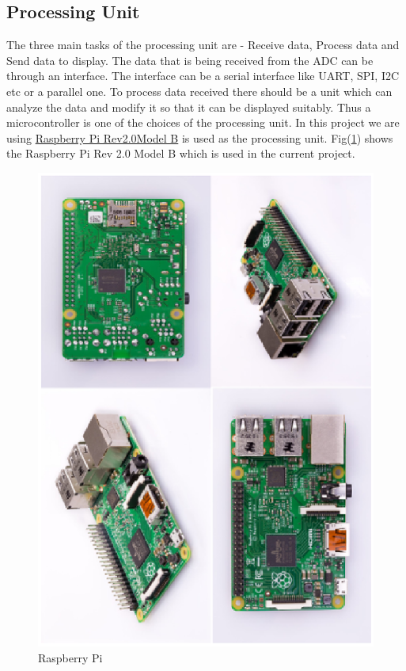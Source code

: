\documentclass[12pt, a4paper, twoside]{article}
\begin{document}
\subsection{Processing Unit}
    The three main tasks of the processing unit are - Receive data, Process data and Send data to display. The data that is being received from the ADC can be through an interface. The interface can be a serial interface like UART, SPI, I2C etc or a parallel one. To process data received there should be a unit which can analyze the data and modify it so that it can be displayed suitably. Thus a microcontroller is one of the choices of the processing unit. In this project we are using \href{https://www.raspberrypi.org/}{Raspberry Pi Rev2.0Model B}\cite{bib_raspberrypi}  is used as the processing unit. Fig(\ref{fig_rpi}) shows the Raspberry Pi Rev 2.0 Model B which is used in the current project.
 
\begin{figure}[ht]
    \centering
    \includegraphics[scale=0.75]{rpi.ps}
    \caption{Raspberry Pi}
    \label{fig_rpi}
\end{figure}
\end{document}
